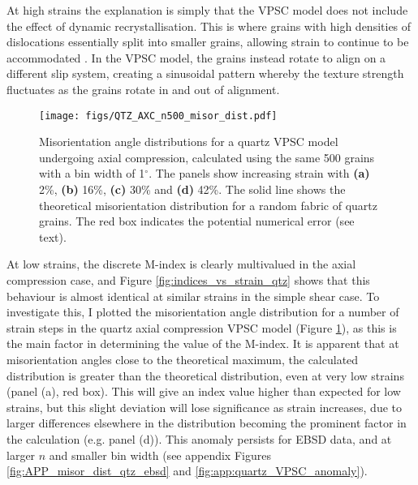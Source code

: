 \documentclass[a4paper,12pt,twoside]{report}
\numberwithin{equation}{chapter}
\begin{document}
At high strains the explanation is simply that the VPSC model does not include the effect of dynamic recrystallisation. This is where grains with high densities of dislocations essentially split into smaller grains, allowing strain to continue to be accommodated \cite{Stipp2002}. In the VPSC model, the grains instead rotate to align on a different slip system, creating a sinusoidal pattern whereby the texture strength fluctuates as the grains rotate in and out of alignment.   


\begin{figure}[t]
  \centering
    \texttt{[image: figs/QTZ\_AXC\_n500\_misor\_dist.pdf]}
  \caption[Misorientation angle distribution (quartz VPSC)]{Misorientation angle distributions for a quartz VPSC model undergoing axial compression, calculated using the same 500 grains with a bin width of 1$^{\circ}$. The panels show increasing strain with \textbf{(a)} 2\%, \textbf{(b)} 16\%, \textbf{(c)} 30\% and \textbf{(d)} 42\%. The solid line shows the theoretical misorientation distribution for a random fabric of quartz grains. The red box indicates the potential numerical error (see text).} 
  \label{fig:qtz_misorientation_dist}
\end{figure} 

At low strains, the discrete M-index is clearly multivalued in the axial compression case, and Figure \ref{fig:indices_vs_strain_qtz} shows that this behaviour is almost identical at similar strains in the simple shear case. To investigate this, I plotted the misorientation angle distribution for a number of strain steps in the quartz axial compression VPSC model (Figure \ref{fig:qtz_misorientation_dist}), as this is the main factor in determining the value of the M-index. It is apparent that at misorientation angles close to the theoretical maximum, the calculated distribution is greater than the theoretical distribution, even at very low strains (panel (a), red box). This will give an index value higher than expected for low strains, but this slight deviation will lose significance as strain increases, due to larger differences elsewhere in the distribution becoming the prominent factor in the calculation (e.g. panel (d)). This anomaly persists for EBSD data, and at larger $n$ and smaller bin width (see appendix Figures \ref{fig:APP_misor_dist_qtz_ebsd} and \ref{fig:app:quartz_VPSC_anomaly}).
\end{document}
